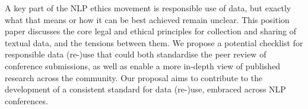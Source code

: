 A key part of the NLP ethics movement is responsible use of data, but exactly  what that means or how it can be best achieved remain unclear. This position paper discusses the core legal and ethical principles for collection and sharing of textual data, and the tensions between them. We propose a potential checklist for responsible data (re-)use that could both standardise the peer review of conference submissions, as well as enable a more in-depth view of published research across the community. Our proposal aims to contribute to the development of a consistent standard for data (re-)use, embraced across NLP conferences.
